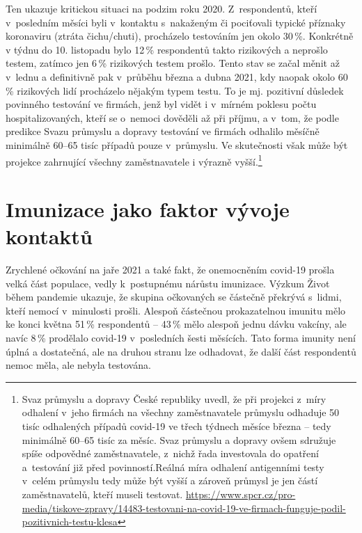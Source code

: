 Ten ukazuje kritickou situaci na podzim roku 2020. Z respondentů, kteří v posledním měsíci byli v kontaktu s nakaženým či pociťovali typické příznaky koronaviru (ztráta čichu/chuti), procházelo testováním jen okolo 30\,\%. Konkrétně v týdnu do 10. listopadu bylo 12\,\% respondentů takto rizikových a neprošlo testem, zatímco jen 6\,\% rizikových testem prošlo. Tento stav se začal měnit až v lednu a definitivně pak v průběhu března a dubna 2021, kdy naopak okolo 60\,\% rizikových lidí procházelo nějakým typem testu. To je mj. pozitivní důsledek
povinného testování ve firmách, jenž byl vidět i v mírném poklesu počtu hospitalizovaných, kteří se o~nemoci dověděli až při příjmu, a v tom, že podle predikce Svazu průmyslu a dopravy testování ve firmách odhalilo měsíčně minimálně 60--65 tisíc případů pouze v průmyslu. Ve skutečnosti však může být projekce zahrnující všechny zaměstnavatele i výrazně vyšší.\footnote{Svaz průmyslu a dopravy České republiky uvedl, že při projekci z míry odhalení v jeho firmách na všechny zaměstnavatele průmyslu odhaduje 50 tisíc odhalených případů covid-19 ve třech týdnech měsíce března – tedy minimálně 60--65 tisíc za měsíc. Svaz průmyslu a dopravy ovšem sdružuje spíše odpovědné zaměstnavatele, z nichž řada investovala do opatření a testování již před povinností.Reálná míra odhalení antigenními testy v celém průmyslu tedy může být vyšší a zároveň průmysl je jen částí zaměstnavatelů, kteří museli testovat. \url{https://www.spcr.cz/pro-media/tiskove-zpravy/14483-testovani-na-covid-19-ve-firmach-funguje-podil-pozitivnich-testu-klesa}}

\section*{Imunizace jako faktor vývoje kontaktů}

Zrychlené očkování na jaře 2021 a také fakt, že onemocněním covid-19 prošla velká část populace, vedly k postupnému nárůstu imunizace. Výzkum Život během pandemie ukazuje, že skupina očkovaných se částečně překrývá s lidmi, kteří nemocí v minulosti prošli. Alespoň částečnou prokazatelnou imunitu mělo ke konci května 51\,\% respondentů – 43\,\% mělo alespoň jednu dávku vakcíny, ale navíc 8\,\% prodělalo covid-19 v posledních šesti měsících. Tato forma imunity není úplná a dostatečná, ale na druhou stranu lze odhadovat, že další část respondentů nemoc měla, ale nebyla testována.

